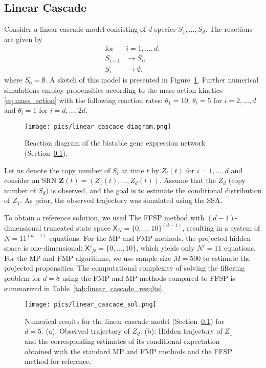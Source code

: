 \subsection{Linear Cascade}
\label{subsec:linear_cascade}
Consider a linear cascade model \cite{Gupta2021DeepCME} consisting of $d$ species $S_1, \dots, S_d$. The reactions are given by
\begin{align*}
    \text{for } &i = 1,\dots, d: \\
    S_{i-1} &\longrightarrow S_{i}, \\
    S_i &\longrightarrow \emptyset,
\end{align*}
where $S_0 = \emptyset$. A sketch of this model is presented in Figure~\ref{fig:linear_cascade_diagram}. Further numerical simulations employ propensities according to the mass action kinetics \eqref{eq:mass_action} with the following reaction rates: $\theta_1 = 10$, $\theta_i = 5$ for $i=2,\dots, d$ and $\theta_{i}=1$ for $i=d,\dots, 2d$.

\begin{figure}
    \centering
    \texttt{[image: pics/linear\_cascade\_diagram.png]}
    \caption{Reaction diagram of the bistable gene expression network (Section~\ref{subsec:linear_cascade}).}
    \label{fig:linear_cascade_diagram}
\end{figure}


Let us denote the copy number of $S_i$ at time $t$ by $Z_i(t)$ for $i = 1,\dots, d$ and consider an \ac{SRN} $\boldsymbol{Z}(t) = \left(Z_1(t), \dots, Z_d(t) \right)$. Assume that the $Z_d$ (copy number of $S_d$) is observed, and the goal is to estimate the conditional distribution of $Z_1$. As prior, the observed trajectory was simulated using the \ac{SSA}.

To obtain a reference solution, we used The \ac{FFSP} method with $(d-1)$-dimensional truncated state space $\mathsf{X}_N = \{0, \dots, 10 \}^{(d-1)}$, resulting in a system of $N = 11^{(d-1)}$ equations. For the \ac{MP} and \ac{FMP} methods, the projected hidden space is one-dimensional: $\mathsf{X}'_N = \{0, \dots, 10 \}$, which yields only  $N' = 11$ equations. For the \ac{MP} and \ac{FMP} algorithms, we use sample size $M=500$ to estimate the projected propensities. The computational complexity of solving the filtering problem for $d=8$ using the \ac{FMP} and \ac{MP} methods compared to \ac{FFSP} is summarized in Table~\ref{tab:linear_cascade_results}. 

\begin{figure}
    \centering
    \texttt{[image: pics/linear\_cascade\_sol.png]}
    \caption{
    Numerical results for the linear cascade model (Section~\ref{subsec:linear_cascade}) for $d=5$. 
     (a): Observed trajectory of $Z_d$. 
     (b): Hidden trajectory of $Z_1$ and the corresponding estimates of its conditional expectation obtained with the standard \ac{MP} and \ac{FMP} methods and the \ac{FFSP} method for reference.
    }
    \label{fig:linear_cascade_means}
\end{figure}

